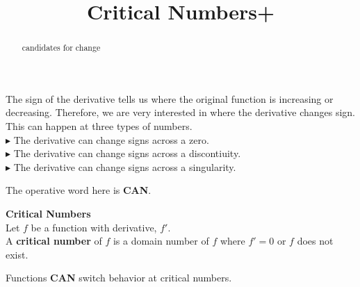 \documentclass{ximera}
\title{Critical Numbers+}
\begin{document}
\begin{abstract}
candidates for change
\end{abstract}
\maketitle








The sign of the derivative tells us where the original function is increasing or decreasing.  Therefore, we are very interested in where the derivative changes sign.\\

This can happen at three types of numbers. \\


\textbf{\textcolor{red!90!darkgray}{$\blacktriangleright$}} The derivative can change signs across a zero. \\


\textbf{\textcolor{red!90!darkgray}{$\blacktriangleright$}} The derivative can change signs across a discontiuity. \\


\textbf{\textcolor{red!90!darkgray}{$\blacktriangleright$}}  The derivative can change signs across a singularity. \\



\begin{center}
The operative word here is \textbf{\textcolor{red!80!black}{CAN}}.
\end{center}




\begin{template}  \textbf{\textcolor{blue!55!black}{Critical Numbers}}  \\

Let $f$ be a function with derivative, $f'$. \\


A \textbf{\textcolor{green!50!black}{critical number}} of $f$ is a domain number of $f$ where $f' = 0$ or $f$ does not exist.


\end{template}

Functions \textbf{\textcolor{red!80!black}{CAN}} switch behavior at critical numbers. \\
\end{document}
